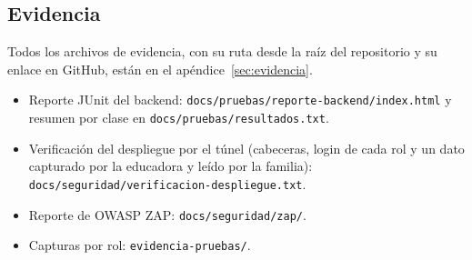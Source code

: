 \subsection{Evidencia}
Todos los archivos de evidencia, con su ruta desde la raíz del repositorio y su enlace en GitHub, están en el apéndice~\ref{sec:evidencia}.
\begin{itemize}
	\item Reporte JUnit del backend: \texttt{docs/\allowbreak{}pruebas/\allowbreak{}reporte-backend/\allowbreak{}index.\allowbreak{}html} y resumen por clase en \texttt{docs/\allowbreak{}pruebas/\allowbreak{}resultados.\allowbreak{}txt}.
	\item Verificación del despliegue por el túnel (cabeceras, login de cada rol y un dato capturado por la educadora y leído por la familia): \texttt{docs/\allowbreak{}seguridad/\allowbreak{}verificacion-despliegue.\allowbreak{}txt}.
	\item Reporte de OWASP ZAP: \texttt{docs/\allowbreak{}seguridad/\allowbreak{}zap/\allowbreak{}}.
	\item Capturas por rol: \texttt{evidencia-pruebas/\allowbreak{}}.
\end{itemize}
